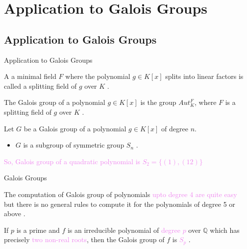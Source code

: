 \documentclass{beamer}
\begin{document}
\section{Application to Galois Groups}

\subsection{Application to Galois Groups}
\begin{frame}{Application to Galois Groups}

    A a minimal field \(F\) where the polynomial \(g \in K[x]\) splits into linear factors is called a \textcolor{green!50!black}{splitting field} of \(g\) over \(K\) \cite{hunger}.
  \vspace{3mm}

  \begin{definition}
    The Galois group of a polynomial \(g \in K[x]\) is the group \(Aut_K^F\), where \(F\) is a splitting field of \(g\) over \(K\) \cite{hunger}.
  \end{definition}

\vspace{2mm}
  \begin{tcolorbox}[colback=white, colframe=blue!40, boxsep=2mm]
    \begin{theorem}
      Let \(G\) be a Galois group of a polynomial \(g \in K[x]\) of degree \(n\).
      \begin{itemize}
      \item \(G\) is  a subgroup of symmetric group \(S_n\) \cite{hunger}.
      \end{itemize}
    \end{theorem}
  \end{tcolorbox}
  \vspace{3mm}
\textcolor{violet}{So, Galois group of a quadratic polynomial is \(S_2=\{(1),(12)\}\)}
\end{frame}


\begin{frame}{Galois Groups}

  The computation of Galois group of polynomials \textcolor{violet}{upto degree 4 are quite easy}\\
  but there is no general rules to compute it for the polynomials of degree 5 or above \cite{hunger}.
  \vspace{10mm}

  \begin{tcolorbox}[colback=white, colframe=blue!40, boxsep=2mm]
\begin{theorem}[Theorem]
If \(p\) is a prime and \(f\) is an irreducible polynomial of \textcolor{violet}{degree \(p\)} over \(\mathbb{Q}\) which has precisely \textcolor{violet}{two non-real roots}, then the Galois group of \(f\) is \textcolor{violet}{\(S_p\)} \cite{hunger}.
\end{theorem}
\end{tcolorbox}
\end{frame}
\end{document}
